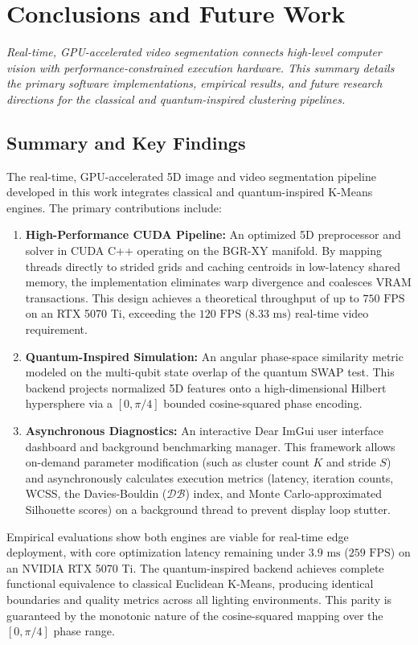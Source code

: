 \chapter{Conclusions and Future Work}\label{chap:conclusions}
{\itshape Real-time, GPU-accelerated video segmentation connects high-level computer vision with performance-constrained execution hardware. This summary details the primary software implementations, empirical results, and future research directions for the classical and quantum-inspired clustering pipelines.}

\section{Summary and Key Findings}
The real-time, GPU-accelerated 5D image and video segmentation pipeline developed in this work integrates classical and quantum-inspired K-Means engines. The primary contributions include:
\begin{enumerate}
    \item \textbf{High-Performance CUDA Pipeline:} An optimized 5D preprocessor and solver in CUDA C++ operating on the BGR-XY manifold. By mapping threads directly to strided grids and caching centroids in low-latency shared memory, the implementation eliminates warp divergence and coalesces VRAM transactions. This design achieves a theoretical throughput of up to $750\text{ FPS}$ on an RTX 5070 Ti, exceeding the $120\text{ FPS}$ ($8.33\text{ ms}$) real-time video requirement.
    \item \textbf{Quantum-Inspired Simulation:} An angular phase-space similarity metric modeled on the multi-qubit state overlap of the quantum SWAP test. This backend projects normalized 5D features onto a high-dimensional Hilbert hypersphere via a $[0, \pi/4]$ bounded cosine-squared phase encoding.
    \item \textbf{Asynchronous Diagnostics:} An interactive Dear ImGui user interface dashboard and background benchmarking manager. This framework allows on-demand parameter modification (such as cluster count $K$ and stride $S$) and asynchronously calculates execution metrics (latency, iteration counts, WCSS, the Davies-Bouldin ($\mathcal{D}\mathcal{B}$) index, and Monte Carlo-approximated Silhouette scores) on a background thread to prevent display loop stutter.
\end{enumerate}

Empirical evaluations show both engines are viable for real-time edge deployment, with core optimization latency remaining under $3.9\text{ ms}$ ($259\text{ FPS}$) on an NVIDIA RTX 5070 Ti. The quantum-inspired backend achieves complete functional equivalence to classical Euclidean K-Means, producing identical boundaries and quality metrics across all lighting environments. This parity is guaranteed by the monotonic nature of the cosine-squared mapping over the $[0, \pi/4]$ phase range.


